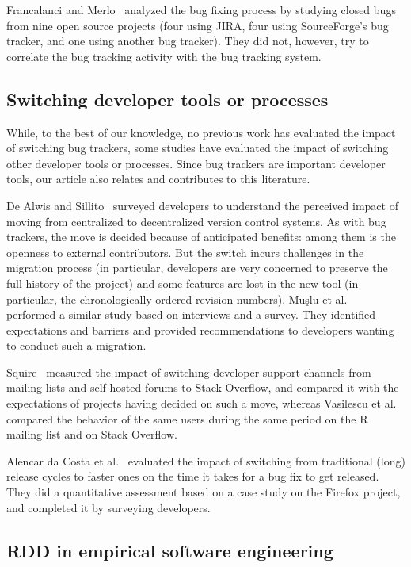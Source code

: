 \documentclass[conference]{IEEEtran}
\begin{document}
Francalanci and Merlo~\cite{francalanci2008empirical} analyzed the bug fixing process by studying closed bugs from nine open source projects (four using JIRA, four using SourceForge's bug tracker, and one using another bug tracker). They did not, however, try to correlate the bug tracking activity with the bug tracking system.

\subsection{Switching developer tools or processes}

While, to the best of our knowledge, no previous work has evaluated the impact of switching bug trackers, some studies have evaluated the impact of switching other developer tools or processes. Since bug trackers are important developer tools, our article also relates and contributes to this literature.

De Alwis and Sillito~\cite{de2009software} surveyed developers to understand the perceived impact of moving from centralized to decentralized version control systems. As with bug trackers, the move is decided because of anticipated benefits: among them is the openness to external contributors. But the switch incurs challenges in the migration process (in particular, developers are very concerned to preserve the full history of the project) and some features are lost in the new tool (in particular, the chronologically ordered revision numbers).
Muşlu et al.~\cite{mucslu2014transition} performed a similar study based on interviews and a survey. They identified expectations and barriers and provided recommendations to developers wanting to conduct such a migration.

Squire~\cite{squire2015should} measured the impact of switching developer support channels from mailing lists and self-hosted forums to Stack Overflow, and compared it with the expectations of projects having decided on such a move,
whereas Vasilescu et al.~\cite{vasilescu2014social} compared the behavior of the same users during the same period on the R mailing list and on Stack Overflow. 

Alencar da Costa et al.~\cite{da2018impact} evaluated the impact of switching from traditional (long) release cycles to faster ones on the time it takes for a bug fix to get released. They did a quantitative assessment based on a case study on the Firefox project, and completed it by surveying developers.

\subsection{RDD in empirical software engineering}
\end{document}
